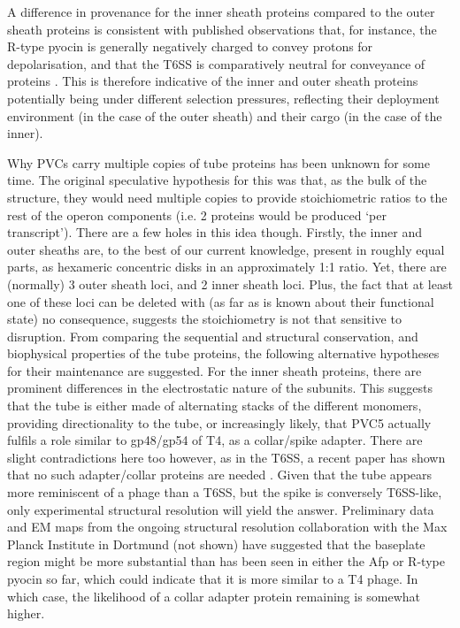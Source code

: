 A difference in provenance for the inner sheath proteins compared to the outer sheath proteins is consistent with published observations that, for instance, the R-type pyocin is generally negatively charged to convey protons for depolarisation, and that the T6SS is comparatively neutral for conveyance of proteins \citep{Ge2015}. This is therefore indicative of the inner and outer sheath proteins potentially being under different selection pressures, reflecting their deployment environment (in the case of the outer sheath) and their cargo (in the case of the inner).

Why PVCs carry multiple copies of tube proteins has been unknown for some time. The original speculative hypothesis for this was that, as the bulk of the structure, they would need multiple copies to provide stoichiometric ratios to the rest of the operon components (i.e. 2 proteins would be produced `per transcript'). There are a few holes in this idea though. Firstly, the inner and outer sheaths are, to the best of our current knowledge, present in roughly equal parts, as hexameric concentric disks in an approximately 1:1 ratio. Yet, there are (normally) 3 outer sheath loci, and 2 inner sheath loci. Plus, the fact that at least one of these loci can be deleted with (as far as is known about their functional state) no consequence, suggests the stoichiometry is not that sensitive to disruption. From comparing the sequential and structural conservation, and biophysical properties of the tube proteins, the following alternative hypotheses for their maintenance are suggested. For the inner sheath proteins, there are prominent differences in the electrostatic nature of the subunits. This suggests that the tube is either made of alternating stacks of the different monomers, providing directionality to the tube, or increasingly likely, that PVC5 actually fulfils a role similar to gp48/gp54 of T4, as a collar/spike adapter. There are slight contradictions here too however, as in the T6SS, a recent paper has shown that no such adapter/collar proteins are needed \citep{Renault2018}. Given that the tube appears more reminiscent of a phage than a T6SS, but the spike is conversely T6SS-like, only experimental structural resolution will yield the answer. Preliminary data and EM maps from the ongoing structural resolution collaboration with the Max Planck Institute in Dortmund (not shown) have suggested that the baseplate region might be more substantial than has been seen in either the Afp or R-type pyocin so far, which could indicate that it is more similar to a T4 phage. In which case, the likelihood of a collar adapter protein remaining is somewhat higher.

